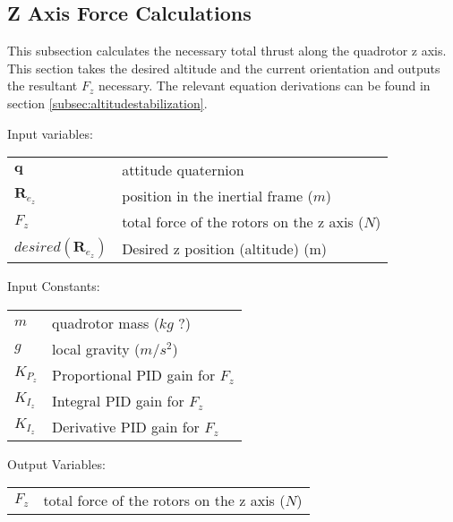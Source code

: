 \documentclass{article}
\numberwithin{equation}{section} %
\newcommand{\bs}[1]{\boldsymbol{#1}}
\begin{document}
\subsection{Z Axis Force Calculations} \label{subsec:zaxisforcecalculations}
This subsection calculates the necessary total thrust along the quadrotor z axis. This section takes the desired altitude and the current orientation and outputs the resultant $F_z$ necessary. The relevant equation derivations can be found in section \ref{subsec:altitudestabilization}.

\bigskip
Input variables:
\begin{tabular}{l l}
 	$ \mathbf{q} $ 			& attitude quaternion \\
 	$ \boldsymbol{R}_{e_z} $	& position in the inertial frame ($m$) \\
 	$ F_{z} $				& total force of the rotors on the z axis ($N$) \\
 	$desired \left( \bs{R}_{e_z} \right)$ & Desired z position (altitude) (m) \\
\end{tabular}

\bigskip
Input Constants:
\begin{tabular}{l l}

 	$m$						& quadrotor mass ($kg$ ?) \\
 	$g$						& local gravity ($m/s^2$) \\
 	$K_{P_z}$				& Proportional PID gain for $F_z$ \\
	$K_{I_z}$				& Integral PID gain for $F_z$ \\
	$K_{I_z}$				& Derivative PID gain for $F_z$ \\
\end{tabular}

\bigskip
Output Variables:
\begin{tabular}{l l}
 	$ F_{z} $				& total force of the rotors on the z axis ($N$) \\
\end{tabular}
\end{document}

